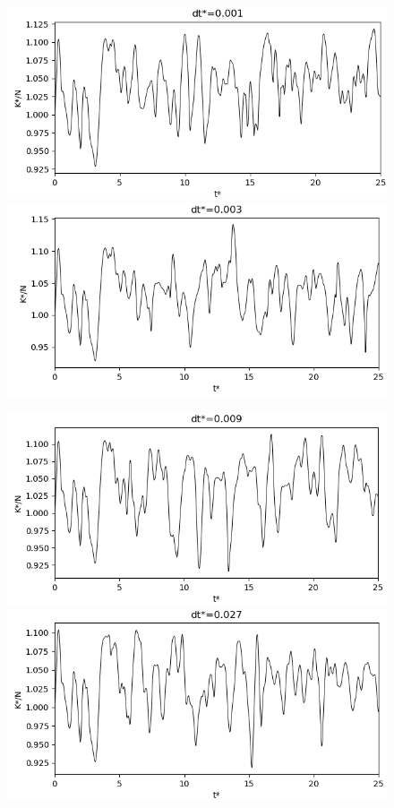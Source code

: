 \documentclass[a4paper,11pt]{article}
\begin{document}
\begin{figure}[H]
	\centering 
	{\includegraphics[width=0.65\linewidth]{runstabili/K0001}}\\
	{\includegraphics[width=0.65\linewidth]{runstabili/K0003}}\\
\end{figure}
\begin{figure}[H]
	\centering 
	{\includegraphics[width=0.65\linewidth]{runstabili/K0009}}\\
	{\includegraphics[width=0.65\linewidth]{runstabili/K0027}}\\
\end{figure}
\end{document}
